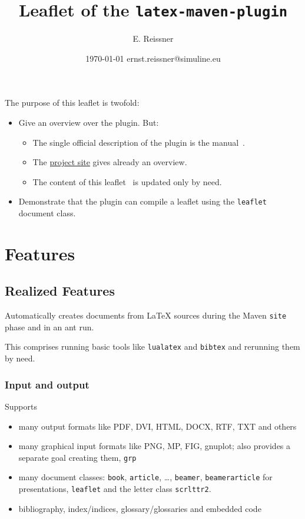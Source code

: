 \documentclass[a4paper,notumble,10pt,english]{leaflet}%
\title{Leaflet of the \texttt{latex-maven-plugin}}
\author{E. Reissner}
\date{\today{} ernst.reissner@simuline.eu}
\begin{document}
\maketitle

The purpose of this leaflet is twofold:
%
\begin{itemize}
  \item Give an overview over the plugin. 
  But: 
  \begin{itemize}
    \item The single official description of the plugin is the manual~\cite{LatexPlugin}.
    \item The 
    \href{http://simuline.eu/LatexMavenPlugin/index.html}{project site} 
    gives already an overview. 
    \item 
    The content of this leaflet~\cite{LeafLeaf} is updated only by need. 
  \end{itemize}
  
  \item Demonstrate that the plugin can compile a leaflet using the \texttt{leaflet} document class. 
\end{itemize}

\section{Features}

\subsection{Realized Features}

Automatically creates documents from LaTeX sources during the Maven \texttt{site} phase 
and in an ant run. 

This comprises running basic tools like \texttt{lualatex} and \texttt{bibtex} 
and rerunning them by need. 

\subsubsection{Input and output}

Supports 
\begin{itemize}
  \item
  many output formats like PDF, DVI, HTML, DOCX, RTF, TXT and others
  \item
  many graphical input formats like PNG, MP, FIG, gnuplot; 
  also provides a separate goal creating them, \texttt{grp} 
  \item
  many document classes: \texttt{book}, \texttt{article}, \dots, 
  \texttt{beamer}, \texttt{beamerarticle} for presentations, 
  \texttt{leaflet} and the letter class \texttt{scrlttr2}. 
  \item
  bibliography, index/indices, glossary/glossaries and embedded code 
\end{itemize}
\end{document}
